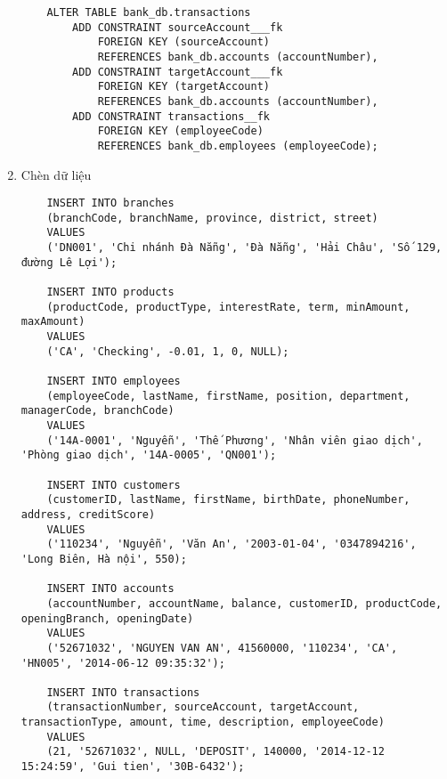 \begin{enumerate}[label=\alph*.]
\begin{lstlisting}
    ALTER TABLE bank_db.transactions
        ADD CONSTRAINT sourceAccount___fk
            FOREIGN KEY (sourceAccount) 
            REFERENCES bank_db.accounts (accountNumber),
        ADD CONSTRAINT targetAccount___fk
            FOREIGN KEY (targetAccount) 
            REFERENCES bank_db.accounts (accountNumber),
        ADD CONSTRAINT transactions__fk
            FOREIGN KEY (employeeCode) 
            REFERENCES bank_db.employees (employeeCode);
    \end{lstlisting}

    \item Chèn dữ liệu


    \begin{lstlisting}
    INSERT INTO branches
    (branchCode, branchName, province, district, street)
    VALUES
    ('DN001', 'Chi nhánh Đà Nẵng', 'Đà Nẵng', 'Hải Châu', 'Số 129, đường Lê Lợi');

    INSERT INTO products
    (productCode, productType, interestRate, term, minAmount, maxAmount)
    VALUES 
    ('CA', 'Checking', -0.01, 1, 0, NULL);

    INSERT INTO employees
    (employeeCode, lastName, firstName, position, department, managerCode, branchCode)
    VALUES 
    ('14A-0001', 'Nguyễn', 'Thế Phương', 'Nhân viên giao dịch', 'Phòng giao dịch', '14A-0005', 'QN001');

    INSERT INTO customers
    (customerID, lastName, firstName, birthDate, phoneNumber, address, creditScore)
    VALUES
    ('110234', 'Nguyễn', 'Văn An', '2003-01-04', '0347894216', 'Long Biên, Hà nội', 550);

    INSERT INTO accounts
    (accountNumber, accountName, balance, customerID, productCode, openingBranch, openingDate)
    VALUES
    ('52671032', 'NGUYEN VAN AN', 41560000, '110234', 'CA', 'HN005', '2014-06-12 09:35:32');

    INSERT INTO transactions
    (transactionNumber, sourceAccount, targetAccount, transactionType, amount, time, description, employeeCode)
    VALUES
    (21, '52671032', NULL, 'DEPOSIT', 140000, '2014-12-12 15:24:59', 'Gui tien', '30B-6432');
    \end{lstlisting}
 
\end{enumerate}
